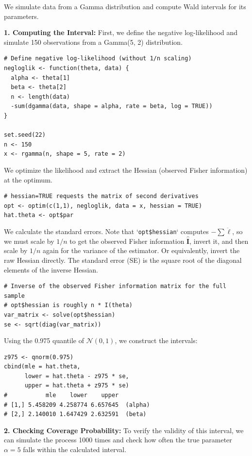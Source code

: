 \begin{ex}
We simulate data from a Gamma distribution and compute Wald intervals for its parameters.

\textbf{1. Computing the Interval:}
First, we define the negative log-likelihood and simulate 150 observations from a Gamma(5, 2) distribution.

\begin{verbatim}
# Define negative log-likelihood (without 1/n scaling)
negloglik <- function(theta, data) {
  alpha <- theta[1]
  beta <- theta[2]
  n <- length(data)
  -sum(dgamma(data, shape = alpha, rate = beta, log = TRUE))
}

set.seed(22)
n <- 150
x <- rgamma(n, shape = 5, rate = 2)
\end{verbatim}

We optimize the likelihood and extract the Hessian (observed Fisher information) at the optimum.
\begin{verbatim}
# hessian=TRUE requests the matrix of second derivatives
opt <- optim(c(1,1), negloglik, data = x, hessian = TRUE)
hat.theta <- opt$par
\end{verbatim}

We calculate the standard errors. Note that `\verb|opt$hessian|` computes $-\sum \ddot{\ell}$, so we must scale by $1/n$ to get the observed Fisher information $\hat{\mathbf{I}}$, invert it, and then scale by $1/n$ again for the variance of the estimator. Or equivalently, invert the raw Hessian directly.
The standard error (SE) is the square root of the diagonal elements of the inverse Hessian.

\begin{verbatim}
# Inverse of the observed Fisher information matrix for the full sample
# opt$hessian is roughly n * I(theta)
var_matrix <- solve(opt$hessian) 
se <- sqrt(diag(var_matrix))
\end{verbatim}

Using the 0.975 quantile of $\mathcal{N}(0,1)$, we construct the intervals:
\begin{verbatim}
z975 <- qnorm(0.975)
cbind(mle = hat.theta,
      lower = hat.theta - z975 * se,
      upper = hat.theta + z975 * se)
#           mle    lower    upper
# [1,] 5.458209 4.258774 6.657645  (alpha)
# [2,] 2.140010 1.647429 2.632591  (beta)
\end{verbatim}

\textbf{2. Checking Coverage Probability:}
To verify the validity of this interval, we can simulate the process 1000 times and check how often the true parameter $\alpha=5$ falls within the calculated interval.


\end{ex}
